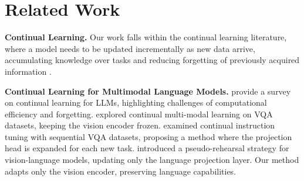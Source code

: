 \section{Related Work}
\label{sec:related_work}


\textbf{Continual Learning.} Our work falls within the continual learning literature, where a model needs to be updated incrementally as new data arrive, accumulating knowledge over tasks and reducing forgetting of previously acquired information \cite{de2021continual}.

\textbf{Continual Learning for Multimodal Language Models.} \citet{wu2024continual} provide a survey on continual learning for LLMs, highlighting challenges of computational efficiency and forgetting. \citet{srivastava2024improving} explored continual multi-modal learning on VQA datasets, keeping the vision encoder frozen. \citet{he2023continual} examined continual instruction tuning with sequential VQA datasets, proposing a method where the projection head is expanded for each new task. \citet{das2024one} introduced a pseudo-rehearsal strategy for vision-language models, updating only the language projection layer. Our method adapts only the vision encoder, preserving language capabilities.

